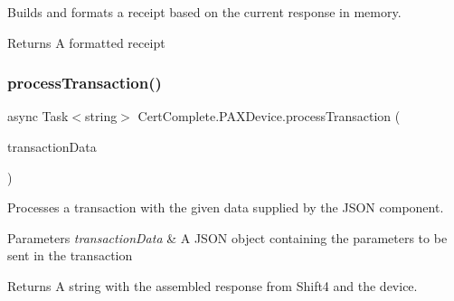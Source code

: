 Builds and formats a receipt based on the current response in memory. 

\begin{DoxyReturn}{Returns}
A formatted receipt
\end{DoxyReturn}
\mbox{\label{class_cert_complete_1_1_p_a_x_device_a532c04c7e9cf54509efa3dd9a9692311}} 
\subsubsection{\texorpdfstring{process\+Transaction()}{processTransaction()}}
{\footnotesize\ttfamily async Task$<$string$>$ Cert\+Complete.\+P\+A\+X\+Device.\+process\+Transaction (\begin{DoxyParamCaption}\item[{Newtonsoft.\+Json.\+Linq.\+J\+Token}]{transaction\+Data }\end{DoxyParamCaption})\hspace{0.3cm}{\ttfamily [inline]}}



Processes a transaction with the given data supplied by the J\+S\+ON component. 


\begin{DoxyParams}{Parameters}
{\em transaction\+Data} & A J\+S\+ON object containing the parameters to be sent in the transaction\\
\hline
\end{DoxyParams}
\begin{DoxyReturn}{Returns}
A string with the assembled response from Shift4 and the device.
\end{DoxyReturn}
\mbox{\label{class_cert_complete_1_1_p_a_x_device_a1a237ea9b4ed7954011c7fea25a2d067}} 
